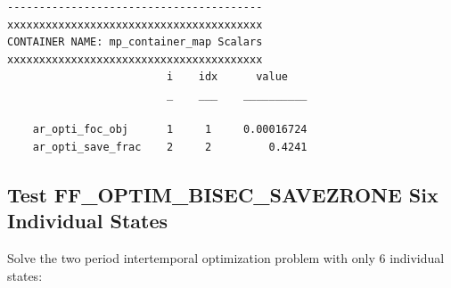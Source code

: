 \documentclass[
]{book}
\begin{document}
\begin{verbatim}
----------------------------------------
xxxxxxxxxxxxxxxxxxxxxxxxxxxxxxxxxxxxxxxx
CONTAINER NAME: mp_container_map Scalars
xxxxxxxxxxxxxxxxxxxxxxxxxxxxxxxxxxxxxxxx
                         i    idx      value   
                         _    ___    __________

    ar_opti_foc_obj      1     1     0.00016724
    ar_opti_save_frac    2     2         0.4241
\end{verbatim}

\hypertarget{test-ff_optim_bisec_savezrone-six-individual-states}{%
\subsection{Test FF\_OPTIM\_BISEC\_SAVEZRONE Six Individual States}\label{test-ff_optim_bisec_savezrone-six-individual-states}}

Solve the two period intertemporal optimization problem with only 6
individual states:
\end{document}
